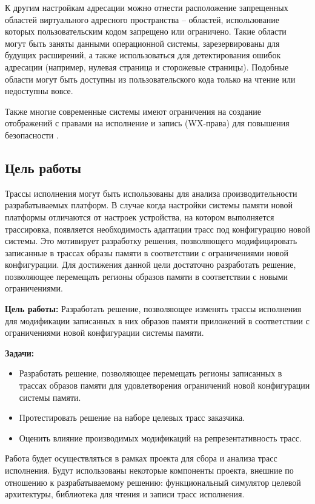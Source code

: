 К другим настройкам адресации можно отнести расположение запрещенных областей виртуального адресного пространства -- областей, использование которых пользовательским кодом запрещено или ограничено. Такие области могут быть заняты данными операционной системы, зарезервированы для будущих расширений, а также использоваться для детектирования ошибок адресации (например, нулевая страница и сторожевые страницы). Подобные области могут быть доступны из пользовательского кода только на чтение или недоступны вовсе.

Также многие современные системы имеют ограничения на создание отображений с правами на исполнение и запись (WX-права) для повышения безопасности \cite{ye_executable_stack,openbsd_kernel_wx}.

\clearpage

\subsection{Цель работы}

Трассы исполнения могут быть использованы для анализа производительности разрабатываемых платформ. В случае когда настройки системы памяти новой платформы отличаются от настроек устройства, на котором выполняется трассировка, появляется необходимость адаптации трасс под конфигурацию новой системы. Это мотивирует разработку решения, позволяющего модифицировать записанные в трассах образы памяти в соответствии с ограничениями новой конфигурации. Для достижения данной цели достаточно разработать решение, позволяющее перемещать регионы образов памяти в соответствии с новыми ограничениями.

\vspace{0.3cm}

{\bf Цель работы:} Разработать решение, позволяющее изменять трассы исполнения для модификации записанных в них образов памяти приложений в соответствии с ограничениями новой конфигурации системы памяти.

\vspace{0.3cm}

{\bf Задачи:}

\begin{itemize}
    \item Разработать решение, позволяющее перемещать регионы записанных в трассах образов памяти для удовлетворения ограничений новой конфигурации системы памяти.
    \item Протестировать решение на наборе целевых трасс заказчика.
    \item Оценить влияние производимых модификаций на репрезентативность трасс.
\end{itemize}

Работа будет осуществляться в рамках проекта для сбора и анализа трасс исполнения. Будут использованы некоторые компоненты проекта, внешние по отношению к разрабатываемому решению: функциональный симулятор целевой архитектуры, библиотека для чтения и записи трасс исполнения.

\clearpage
